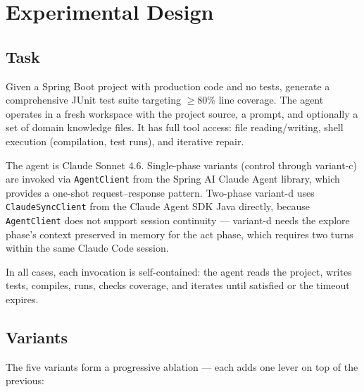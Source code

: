 \documentclass[11pt,a4paper]{article}
\begin{document}


\section{Experimental Design}

\subsection{Task}

Given a Spring Boot project with production code and no tests, generate a
comprehensive JUnit test suite targeting $\geq$80\% line coverage. The agent
operates in a fresh workspace with the project source, a prompt, and optionally
a set of domain knowledge files. It has full tool access: file reading/writing,
shell execution (compilation, test runs), and iterative repair.

The agent is Claude Sonnet 4.6. Single-phase variants (control through variant-c)
are invoked via \texttt{AgentClient} from the Spring AI Claude Agent library,
which provides a one-shot request--response pattern. Two-phase variant-d uses
\texttt{ClaudeSyncClient} from the Claude Agent SDK Java directly, because
\texttt{AgentClient} does not support session continuity --- variant-d needs
the explore phase's context preserved in memory for the act phase, which requires
two turns within the same Claude Code session.

In all cases, each invocation is self-contained: the agent reads the project,
writes tests, compiles, runs, checks coverage, and iterates until satisfied
or the timeout expires.

\subsection{Variants}

The five variants form a progressive ablation --- each adds one lever on top
of the previous:
\end{document}
